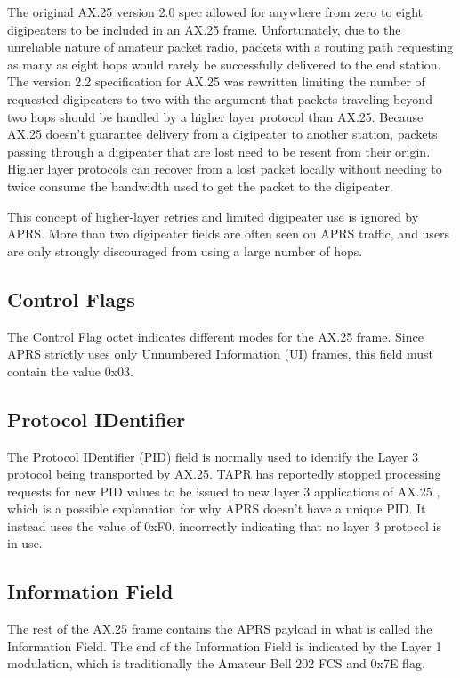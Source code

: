 The original AX.25 version 2.0 spec allowed for anywhere from zero to eight digipeaters to
be included in an AX.25 frame. Unfortunately, due to the unreliable nature of amateur 
packet radio, packets with a routing path requesting as many as eight hops would rarely be 
successfully delivered to the end station.
The version 2.2 specification for AX.25 was
rewritten limiting the number of requested digipeaters to two with the argument that packets
traveling beyond two hops should be handled by a higher layer protocol than AX.25.
Because AX.25 doesn't guarantee delivery from a digipeater to another station,
packets passing through a digipeater that are lost need to be
resent from their origin.
Higher layer protocols can recover from a lost packet locally 
without needing to twice consume
the bandwidth used to get the packet to the digipeater.

This concept of higher-layer retries and limited digipeater use is ignored by APRS.
More than two digipeater fields are often seen on APRS traffic, 
and users are only strongly discouraged from using a large number of hops.

\subsection{Control Flags}

The Control Flag octet indicates different modes for the AX.25 frame.
Since APRS strictly uses only Unnumbered Information (UI) frames, this field must
contain the value 0x03.

\subsection{Protocol IDentifier}

The Protocol IDentifier (PID) field is normally used to identify the Layer 3 protocol
being transported by AX.25. TAPR has reportedly stopped processing requests for new PID
values to be issued to new layer 3 applications of AX.25 \cite{millernopid}, 
which is a possible explanation for why APRS doesn't have a unique PID.
It instead uses the value of 0xF0, incorrectly indicating that no layer 3 protocol is in use.

\subsection{Information Field}

The rest of the AX.25 frame contains the APRS payload in
what is called the Information Field.
The end of the Information Field is indicated by the Layer 1 modulation, which is traditionally
the Amateur Bell 202 FCS and 0x7E flag.


